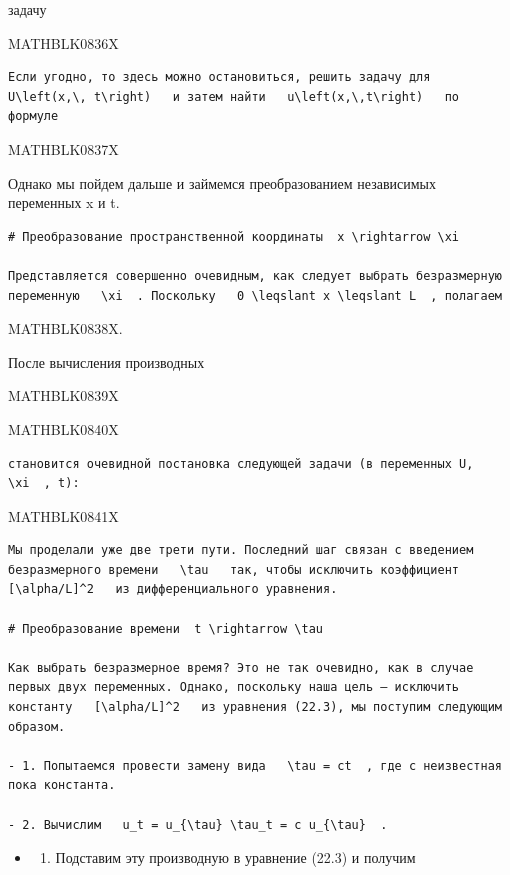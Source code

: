 \documentclass[
]{article}
\providecommand{\tightlist}{%
  \setlength{\itemsep}{0pt}\setlength{\parskip}{0pt}}
\begin{document}
{{задачу

MATHBLK0836X

\begin{verbatim}
Если угодно, то здесь можно остановиться, решить задачу для   U\left(x,\, t\right)   и затем найти   u\left(x,\,t\right)   по формуле
\end{verbatim}

MATHBLK0837X

Однако мы пойдем дальше и займемся преобразованием независимых
переменных x и t.

\begin{verbatim}
# Преобразование пространственной координаты  x \rightarrow \xi 

Представляется совершенно очевидным, как следует выбрать безразмерную переменную   \xi  . Поскольку   0 \leqslant x \leqslant L  , полагаем
\end{verbatim}

MATHBLK0838X.

После вычисления производных

MATHBLK0839X

MATHBLK0840X

\begin{verbatim}
становится очевидной постановка следующей задачи (в переменных U,   \xi  , t):
\end{verbatim}

MATHBLK0841X

\begin{verbatim}
Мы проделали уже две трети пути. Последний шаг связан с введением безразмерного времени   \tau   так, чтобы исключить коэффициент   [\alpha/L]^2   из дифференциального уравнения.

# Преобразование времени  t \rightarrow \tau 

Как выбрать безразмерное время? Это не так очевидно, как в случае первых двух переменных. Однако, поскольку наша цель — исключить константу   [\alpha/L]^2   из уравнения (22.3), мы поступим следующим образом.

- 1. Попытаемся провести замену вида   \tau = ct  , где c неизвестная пока константа.

- 2. Вычислим   u_t = u_{\tau} \tau_t = c u_{\tau}  .
\end{verbatim}

\begin{itemize}
\tightlist
\item
  \begin{enumerate}
  \def\labelenumi{\arabic{enumi}.}
  \setcounter{enumi}{2}
  \tightlist
  \item
    Подставим эту производную в уравнение (22.3) и получим
  \end{enumerate}
\end{itemize}

}}
\end{document}
